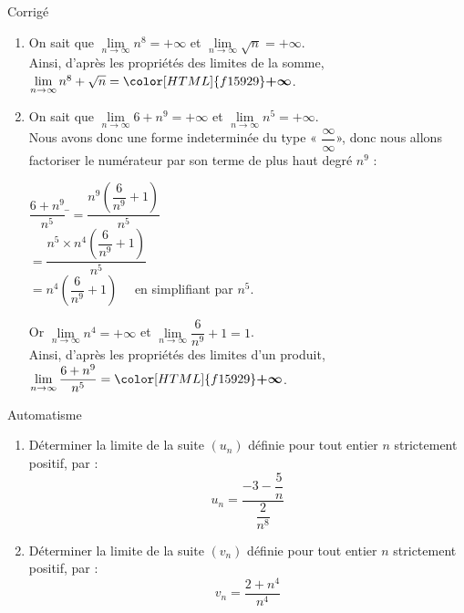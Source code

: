 \documentclass[a4paper,11pt,exos]{nsi} %
\newcounter{autNum}
\newcommand{\aut}[1]
{
	\addtocounter{autNum}{1}
	{\titlefont\color{UGLiBlue}\Large Automatisme\ \theautNum\ \normalsize{#1}}\smallskip	
}
\newcounter{corNum}
\newcommand{\cor}[1]
{
	\addtocounter{corNum}{1}
	{\titlefont\color{UGLiOrange}\Large Corrigé\ \thecorNum\ \normalsize{#1}}\smallskip	
}
\begin{document}
\cor{}
\begin{enumerate}[itemsep=1em]
    \item On sait que $\lim\limits_{n\to\infty} n^{8}=+\infty$ et $\lim\limits_{n\to\infty} \sqrt{n}=+\infty$.\\Ainsi, d'après les propriétés des limites de la somme, $\lim\limits_{n\to\infty} n^{8}+\sqrt{n}={\color[HTML]{f15929}\boldsymbol{+\infty}}$.
    \item On sait que $\lim\limits_{n\to\infty} 6+n^9=+\infty$ et $\lim\limits_{n\to\infty} n^5=+\infty$.\\Nous avons donc une forme indeterminée du type « $\dfrac{\infty}{\infty}$», donc nous allons factoriser le numérateur par son terme de plus haut degré $n^9$ :
    \begin{tabbing}
        $\dfrac{6+n^9}{n^5}$    \=$=\dfrac{n^9\left(\dfrac{6}{n^9}+1\right)}{n^5}$\\[.5em]
        \>  $=\dfrac{n^5\times n^4\left(\dfrac{6}{n^9}+1\right)}{n^5}$ \\[.5em]
        \>  $= n^4\left(\dfrac{6}{n^9}+1\right)\quad$ en simplifiant par $n^5$. 
    \end{tabbing}
    Or $\lim\limits_{n\to\infty} n^4=+\infty$ et $\lim\limits_{n\to\infty} \dfrac{6}{n^9}+1=1$.\\
    Ainsi, d'après les propriétés des limites d'un produit, $\lim\limits_{n\to\infty} \dfrac{6+n^9}{n^5}={\color[HTML]{f15929}\boldsymbol{+\infty}}$.
    \end{enumerate}
    

    \aut{}
    \begin{enumerate}
        \item Déterminer la limite de la suite $(u_n)$ définie pour tout entier $n$ strictement positif, par : $$u_n=\dfrac{-3-\dfrac{5}{n}}{\dfrac{2}{n^8}}$$
        \item Déterminer la limite de la suite $(v_n)$ définie pour tout entier $n$ strictement positif, par : $$v_n=\dfrac{2+n^4}{n^4}$$
    \end{enumerate}
    
\end{document}
